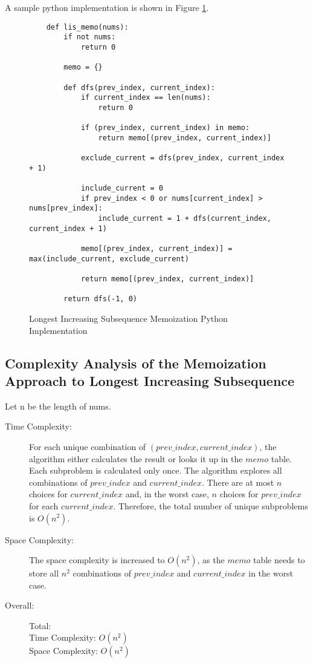 A sample python implementation is shown in Figure \ref{fig:lis-memo}.

\begin{figure}[H]
    \centering
    \begin{lstlisting}
    def lis_memo(nums):
        if not nums:
            return 0
    
        memo = {}
    
        def dfs(prev_index, current_index):
            if current_index == len(nums):
                return 0
    
            if (prev_index, current_index) in memo:
                return memo[(prev_index, current_index)]
            
            exclude_current = dfs(prev_index, current_index + 1)
    
            include_current = 0
            if prev_index < 0 or nums[current_index] > nums[prev_index]:
                include_current = 1 + dfs(current_index, current_index + 1)
    
            memo[(prev_index, current_index)] = max(include_current, exclude_current)
    
            return memo[(prev_index, current_index)]
    
        return dfs(-1, 0)
    \end{lstlisting}
    \caption{Longest Increasing Subsequence Memoization Python Implementation}
    \label{fig:lis-memo}
\end{figure}

\subsection{Complexity Analysis of the Memoization Approach to Longest Increasing Subsequence}
Let n be the length of nums.
\begin{description}
    \item[Time Complexity:]
        For each unique combination of $(prev\_index, current\_index)$, the algorithm either calculates the result or looks it up in the $memo$ table.
        Each subproblem is calculated only once.
        The algorithm explores all combinations of $prev\_index$ and $current\_index$.
        There are at most $n$ choices for $current\_index$ and,
        in the worst case, $n$ choices for $prev\_index$ for each $current\_index$.
        Therefore, the total number of unique subproblems is $O(n^2)$.
        
    \item[Space Complexity:] 
        The space complexity is increased to $O(n^2)$,
        as the $memo$ table needs to store all $n^2$ combinations of $prev\_index$ and $current\_index$ in the worst case.
        
        
    \item[Overall:] Total:\\
        Time Complexity: $O(n^2)$\\
        Space Complexity: $O(n^2)$
    
\end{description}

